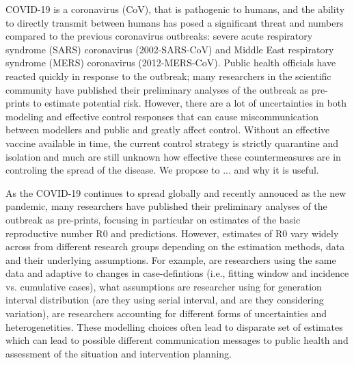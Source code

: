 
COVID-19 is a coronavirus (CoV), that is pathogenic to humans, and the ability to directly transmit between humans has posed a significant threat and numbers compared to the previous coronavirus outbreaks: severe acute respiratory syndrome (SARS) coronavirus (2002-SARS-CoV) and Middle East respiratory syndrome (MERS) coronavirus (2012-MERS-CoV). 
Public health officials have reacted quickly in response to the outbreak; many researchers in the scientific community have published their preliminary analyses of the outbreak as pre-prints to estimate potential risk. 
However, there are a lot of uncertainties in both modeling and effective control responses that can cause miscommunication between modellers and public and greatly affect control.   
Without an effective vaccine available in time, the current control strategy is strictly quarantine and isolation and much are still unknown how effective these countermeasures are in controling the spread of the disease.  
We propose to ... and why it is useful. 









As the COVID-19 continues to spread globally and recently annouced as the new pandemic, many researchers have published their preliminary analyses of the outbreak as pre-prints, focusing in particular on estimates of the basic reproductive number R0 and predictions.
However, estimates of R0 vary widely across from different research groups depending on the estimation methods, data and their underlying assumptions.
For example, are researchers using the same data and adaptive to changes in case-defintions (i.e., fitting window and incidence vs. cumulative cases), what assumptions are researcher using for generation interval distribution (are they using serial interval, and are they considering variation), are researchers accounting for different forms of uncertainties and heterogenetities.
These modelling choices often lead to disparate set of estimates which can lead to possible different communication messages to public health and assessment of the situation and intervention planning.

